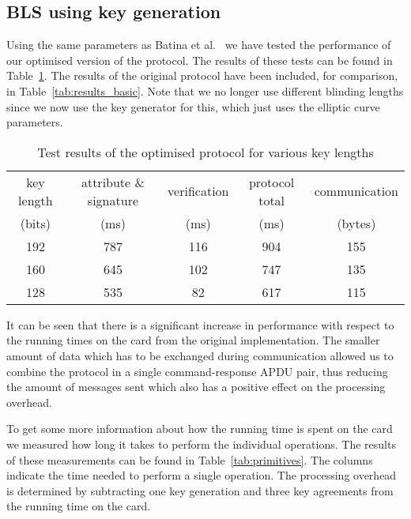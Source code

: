 \subsection{BLS using key generation}

Using the same parameters as Batina et al.~\cite{BatinaHJMV10} we have
tested the performance of our optimised version of the protocol. The
results of these tests can be found in Table~\ref{tab:results_optimised}. The results of
the original protocol have been included, for comparison, in
Table~\ref{tab:results_basic}. Note
that we no longer use different blinding lengths since we now use the
key generator for this, which just uses the elliptic curve parameters.

\begin{table}
  \centering
  \caption{Test results of the optimised protocol for various key
    lengths}\label{tab:results_optimised}
  \renewcommand{\tabcolsep}{1.25mm}
  \renewcommand{\arraystretch}{1.25}
  \begin{tabular}{| c || c | c | c | c |}\hline
    key length & attribute \& signature & verification & protocol total &
      communication \\
    (bits) & (ms) & (ms) & (ms) & (bytes) \\\hline
    \hline
    192 & 787 & 116 & 904 & 155 \\\hline
    160 & 645 & 102 & 747 & 135 \\\hline
    128 & 535 &  82 & 617 & 115 \\\hline
  \end{tabular}
\end{table}

It can be seen that there is a significant increase in performance with respect
to the running times on the card from the original implementation. The smaller
amount of data which has to be exchanged during communication allowed us to
combine the protocol in a single command-response APDU pair, thus reducing the
amount of messages sent which also has a positive effect on the processing
overhead.

To get some more information about how the running time is spent on the card we
measured how long it takes to perform the individual operations. The results of
these measurements can be found in Table~\ref{tab:primitives}. The columns
indicate the time needed to perform a single operation. The processing overhead
is determined by subtracting one key generation and three key agreements from
the running time on the card.

